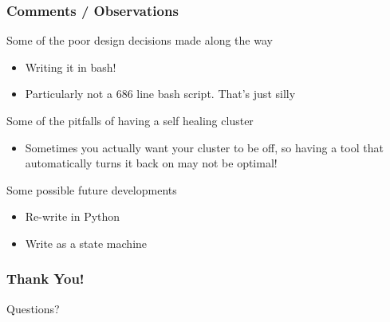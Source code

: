 \documentclass{beamer}
\begin{document}
\begin{frame}
\frametitle{Comments / Observations}
Some of the poor design decisions made along the way
\begin{itemize}
	\item Writing it in bash!
	\item Particularly not a 686 line bash script. That’s just silly
\end{itemize}
Some of the pitfalls of having a self healing cluster
\begin{itemize}
	\item Sometimes you actually want your cluster to be off, so having a tool that automatically turns it back on may not be optimal!
\end{itemize}
Some possible future developments
\begin{itemize}
	\item Re-write in Python
	\item Write as a state machine
\end{itemize}
\end{frame}

\begin{frame}
\frametitle{Thank You!}
\begin{center}
	Questions?
\end{center}
\end{frame}
\end{document}

